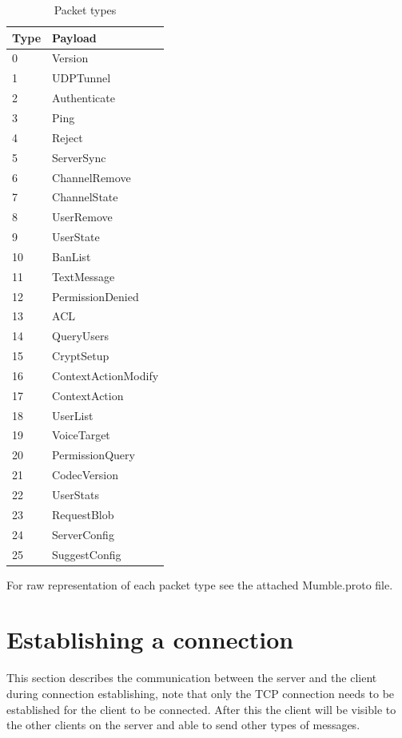 \documentclass[11pt]{article} %
\begin{document}
\begin{table}[H]\begin{center}
	\caption{Packet types}\label{tbl:packettypes}

	\begin{tabular}{ll}
		Type & Payload \\
		\hline
		0  & Version \\
		1  & UDPTunnel \\
		2  & Authenticate \\
		3  & Ping \\
		4  & Reject \\
		5  & ServerSync \\
		6  & ChannelRemove \\
		7  & ChannelState \\
		8  & UserRemove \\
		9  & UserState \\
		10 & BanList \\
		11 & TextMessage \\
		12 & PermissionDenied \\
		13 & ACL \\
		14 & QueryUsers \\
		15 & CryptSetup \\
		16 & ContextActionModify \\
		17 & ContextAction \\
		18 & UserList \\
		19 & VoiceTarget \\
		20 & PermissionQuery \\
		21 & CodecVersion \\
		22 & UserStats \\
		23 & RequestBlob \\
		24 & ServerConfig \\
		25 & SuggestConfig \\
	\end{tabular}
\end{center}\end{table}

For raw representation of each packet type see the attached Mumble.proto file.

\section{Establishing a connection}
This section describes the communication between the server and the client during connection establishing, note that only the TCP connection needs to be established for the client to be connected. After this the client will be visible to the other clients on the server and able to send other types of messages.
\end{document}
